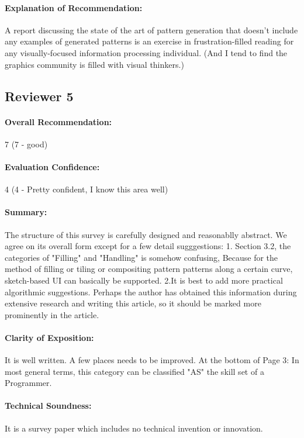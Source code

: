 \documentclass{egpubl}
\newcommand{\rev}[2]{{\color{greenrev}\textsuperscript{#1}#2}}
\renewcommand{\rev}[2]{{#2}}
\begin{document}
\paragraph*{Explanation of Recommendation:} A report discussing the state of the art of pattern generation that doesn't include any examples of generated patterns is an exercise in frustration-filled reading for any visually-focused information processing individual. (And I tend to find the graphics community is filled with visual thinkers.)


\rev{Comments}{}


\subsection*{Reviewer 5} 

\paragraph*{Overall Recommendation:} 7 (7 - good)
\paragraph*{Evaluation Confidence:} 4 (4 - Pretty confident, I know this area well)
\paragraph*{Summary:} The structure of this survey is carefully designed and reasonablly abstract. We agree on its overall form except for a few detail sugggestions:
1. Section 3.2, the categories of "Filling" and "Handling" is somehow confusing, Because for the method of filling or tiling or compositing pattern patterns along a certain curve, sketch-based UI can basically be supported.
2.It is best to add more practical algorithmic suggestions. Perhaps the author has obtained this information during extensive research and writing this article, so it should be marked more prominently in the article.
\paragraph*{Clarity of Exposition:} It is well written.  A few places needs to be improved.
At the bottom of Page 3:  In most general terms, this category can be classified  "AS" the skill set of a Programmer.
\paragraph*{Technical Soundness:} It is a survey paper which includes no technical invention or innovation.
\end{document}
